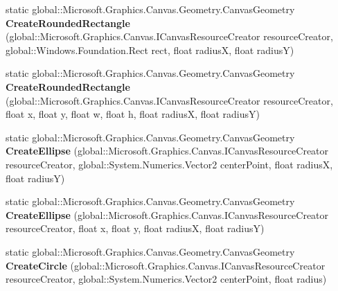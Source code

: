 \begin{DoxyCompactItemize}
\item 
\mbox{\label{class_microsoft_1_1_graphics_1_1_canvas_1_1_geometry_1_1_canvas_geometry_a009788642a98b2179cad9bba9b1965dd}} 
static global\+::\+Microsoft.\+Graphics.\+Canvas.\+Geometry.\+Canvas\+Geometry {\bfseries Create\+Rounded\+Rectangle} (global\+::\+Microsoft.\+Graphics.\+Canvas.\+I\+Canvas\+Resource\+Creator resource\+Creator, global\+::\+Windows.\+Foundation.\+Rect rect, float radiusX, float radiusY)
\item 
\mbox{\label{class_microsoft_1_1_graphics_1_1_canvas_1_1_geometry_1_1_canvas_geometry_a11c20ec470232154e23df2c9cb9c10dd}} 
static global\+::\+Microsoft.\+Graphics.\+Canvas.\+Geometry.\+Canvas\+Geometry {\bfseries Create\+Rounded\+Rectangle} (global\+::\+Microsoft.\+Graphics.\+Canvas.\+I\+Canvas\+Resource\+Creator resource\+Creator, float x, float y, float w, float h, float radiusX, float radiusY)
\item 
\mbox{\label{class_microsoft_1_1_graphics_1_1_canvas_1_1_geometry_1_1_canvas_geometry_a66008979f1f25a70e38f6044abf0aca6}} 
static global\+::\+Microsoft.\+Graphics.\+Canvas.\+Geometry.\+Canvas\+Geometry {\bfseries Create\+Ellipse} (global\+::\+Microsoft.\+Graphics.\+Canvas.\+I\+Canvas\+Resource\+Creator resource\+Creator, global\+::\+System.\+Numerics.\+Vector2 center\+Point, float radiusX, float radiusY)
\item 
\mbox{\label{class_microsoft_1_1_graphics_1_1_canvas_1_1_geometry_1_1_canvas_geometry_a60460178970082d9e7b6673b17fb88ec}} 
static global\+::\+Microsoft.\+Graphics.\+Canvas.\+Geometry.\+Canvas\+Geometry {\bfseries Create\+Ellipse} (global\+::\+Microsoft.\+Graphics.\+Canvas.\+I\+Canvas\+Resource\+Creator resource\+Creator, float x, float y, float radiusX, float radiusY)
\item 
\mbox{\label{class_microsoft_1_1_graphics_1_1_canvas_1_1_geometry_1_1_canvas_geometry_a098a43184492d859176fd9ccac7a99b9}} 
static global\+::\+Microsoft.\+Graphics.\+Canvas.\+Geometry.\+Canvas\+Geometry {\bfseries Create\+Circle} (global\+::\+Microsoft.\+Graphics.\+Canvas.\+I\+Canvas\+Resource\+Creator resource\+Creator, global\+::\+System.\+Numerics.\+Vector2 center\+Point, float radius)

\end{DoxyCompactItemize}
